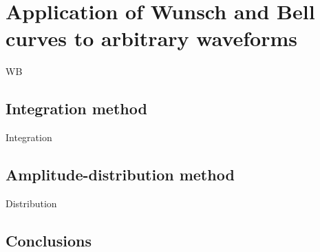 \section{Application of Wunsch and Bell curves to arbitrary waveforms}
\label{sec:wb_for_arbitrary_wvfs}

WB



\subsection{Integration method}

Integration



\subsection{Amplitude-distribution method}

Distribution



%

\subsection{Conclusions}

